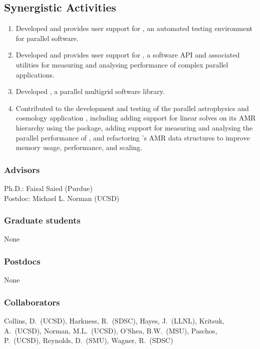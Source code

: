 \documentclass[11pt,letterpaper]{article}
\begin{document}
\subsection{Synergistic Activities}

\begin{enumerate}
\item Developed and provides user support for , an automated testing environment for parallel software.
\item Developed and provides user support for , a software API and associated utilities for measuring and analysing performance of complex parallel applications.
\item Developed , a parallel multigrid software library.
\item Contributed to the development and testing of the parallel astrophysics and cosmology application , including adding support for linear solves on its AMR hierarchy using the  package, adding support for measuring
and analysing the parallel performance of , and refactoring
's AMR data structures to improve memory usage, performance, and scaling.
\end{enumerate}

\subsubsection{Advisors}

Ph.D.: Faisal Saied (Purdue) \\
Postdoc: Michael L. Norman (UCSD)

\subsubsection{Graduate students}
None
\subsubsection{Postdocs}

None

\subsubsection{Collaborators}

Collins, D.~(UCSD), 
Harkness, R.~(SDSC), 
Hayes, J.~(LLNL), 
Kritsuk, A.~(UCSD), 
Norman, M.L.~(UCSD), 
O'Shea, B.W.~(MSU), 
Paschos, P.~(UCSD), 
Reynolds, D.~(SMU), 
Wagner, R.~(SDSC)
\end{document}
